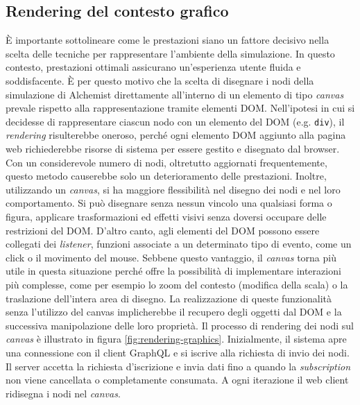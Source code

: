 \subsection{Rendering del contesto grafico}\label{section:rendering-analysis}
È importante sottolineare come le prestazioni siano un fattore decisivo nella scelta delle tecniche per rappresentare l'ambiente della simulazione.
In questo contesto, prestazioni ottimali assicurano un'esperienza utente fluida e soddisfacente. È per questo motivo che la scelta di disegnare i nodi della simulazione di Alchemist direttamente all'interno di un elemento di tipo \textit{canvas } prevale rispetto alla rappresentazione tramite elementi \ac{DOM}. Nell'ipotesi in cui si decidesse di rappresentare ciascun nodo con un elemento del DOM (e.g. \texttt{div}), il \textit{rendering} risulterebbe oneroso, perché ogni elemento \ac{DOM} aggiunto alla pagina web richiederebbe risorse di sistema per essere gestito e disegnato dal browser. Con un considerevole numero di nodi, oltretutto aggiornati frequentemente, questo metodo causerebbe solo un deterioramento delle prestazioni. Inoltre, utilizzando un \textit{canvas}, si ha maggiore flessibilità nel disegno dei nodi e nel loro comportamento. Si può disegnare senza nessun vincolo una qualsiasi forma o figura, applicare trasformazioni ed effetti visivi senza doversi occupare delle restrizioni del \ac{DOM}. D'altro canto, agli elementi del \ac{DOM} possono essere collegati dei \textit{listener}, funzioni associate a un determinato tipo di evento, come un click o il movimento del mouse. Sebbene questo vantaggio, il \textit{canvas} torna più utile in questa situazione perché offre la possibilità di implementare interazioni più complesse, come per esempio lo zoom del contesto (modifica della scala) o la traslazione dell'intera area di disegno. La realizzazione di queste funzionalità senza l'utilizzo del canvas implicherebbe il recupero degli oggetti dal \ac{DOM} e la successiva manipolazione delle loro proprietà.
Il processo di rendering dei nodi sul \textit{canvas} è illustrato in figura \cref{fig:rendering-graphics}. Inizialmente, il sistema apre una connessione con il client GraphQL e si iscrive alla richiesta di invio dei nodi. Il server accetta la richiesta d'iscrizione e invia dati fino a quando la \textit{subscription} non viene cancellata o completamente consumata. A ogni iterazione il web client ridisegna i nodi nel \textit{canvas}.
